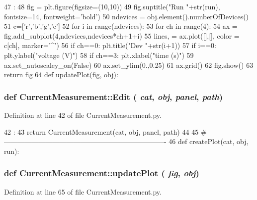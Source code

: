 \begin{DoxyCode}
47                              :
48     fig = plt.figure(figsize=(10,10))
49     fig.suptitle("Run "+str(run), fontsize=14, fontweight='bold')
50     ndevices = obj.element().numberOfDevices()
51     c=['r','b','g','c']
52     for i in range(ndevices):
53         for ch in range(4):
54             ax = fig.add_subplot(4,ndevices,ndevices*ch+1+i)
55             lines, = ax.plot([],[], color = c[ch], marker='^')
56             if ch==0: plt.title("Dev "+str(i+1))
57             if i==0: plt.ylabel("voltage (V)")
58             if ch==3: plt.xlabel("time (s)")
59             ax.set_autoscaley_on(False)
60             ax.set_ylim(0.,0.25)
61             ax.grid()        
62     fig.show()    
63     return fig
64 
def updatePlot(fig, obj):
\end{DoxyCode}
\hypertarget{namespaceCurrentMeasurement_a61f2879fa568ed0a21e0418f3e4d7125}{
\subsubsection[{Edit}]{\setlength{\rightskip}{0pt plus 5cm}def CurrentMeasurement::Edit ( {\em cat}, \/   {\em obj}, \/   {\em panel}, \/   {\em path})}}
\label{namespaceCurrentMeasurement_a61f2879fa568ed0a21e0418f3e4d7125}


Definition at line 42 of file CurrentMeasurement.py.


\begin{DoxyCode}
42                                 :
43     return CurrentMeasurement(cat, obj, panel, path)
44 
45 #----------------------------------------------------------------------
46 
def createPlot(cat, obj, run):
\end{DoxyCode}
\hypertarget{namespaceCurrentMeasurement_a115af1da683fe870c7428745c6771c1b}{
\subsubsection[{updatePlot}]{\setlength{\rightskip}{0pt plus 5cm}def CurrentMeasurement::updatePlot ( {\em fig}, \/   {\em obj})}}
\label{namespaceCurrentMeasurement_a115af1da683fe870c7428745c6771c1b}


Definition at line 65 of file CurrentMeasurement.py.


